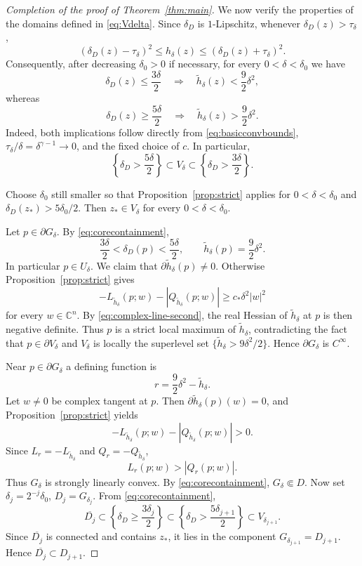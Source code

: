 \documentclass[12pt]{amsart}
\newcommand{\C}{\mathbb C}
\begin{document}
\begin{proof}[Completion of the proof of Theorem~\ref{thm:main}]
We now verify the properties of the domains defined in \eqref{eq:Vdelta}.
Since $\delta_D$ is $1$-Lipschitz, whenever $\delta_D(z)>\tau_\delta$,
\begin{equation}\label{eq:basicconvbounds}
 (\delta_D(z)-\tau_\delta)^2\le h_\delta(z)
 \le(\delta_D(z)+\tau_\delta)^2.
\end{equation}
Consequently, after decreasing $\delta_0>0$ if necessary, for every
$0<\delta<\delta_0$ we have
\[
 \delta_D(z)\le\frac{3\delta}{2}
 \quad\Longrightarrow\quad
 \widetilde h_\delta(z)<\frac92\delta^2,
\]
whereas
\[
 \delta_D(z)\ge\frac{5\delta}{2}
 \quad\Longrightarrow\quad
 \widetilde h_\delta(z)>\frac92\delta^2.
\]
Indeed, both implications follow directly from \eqref{eq:basicconvbounds},
$\tau_\delta/\delta=\delta^{\gamma-1}\to0$, and the fixed choice of $c$.
In particular,
\begin{equation}\label{eq:corecontainment}
 \left\{\delta_D>\frac{5\delta}{2}\right\}
 \subset V_\delta
 \subset
 \left\{\delta_D>\frac{3\delta}{2}\right\}.
\end{equation}

Choose $\delta_0$ still smaller so that Proposition~\ref{prop:strict}
applies for $0<\delta<\delta_0$ and
$\delta_D(z_*)>5\delta_0/2$. Then $z_*\in V_\delta$ for every
$0<\delta<\delta_0$.

Let $p\in\partial G_\delta$. By \eqref{eq:corecontainment},
\[
 \frac{3\delta}{2}<\delta_D(p)<\frac{5\delta}{2},
 \qquad
 \widetilde h_\delta(p)=\frac92\delta^2.
\]
In particular $p\in U_\delta$. We claim that
$\partial\widetilde h_\delta(p)\ne0$. Otherwise
Proposition~\ref{prop:strict} gives
\[
 -L_{\widetilde h_\delta}(p;w)-|Q_{\widetilde h_\delta}(p;w)|
 \ge c_*\delta^2|w|^2
\]
for every $w\in\C^n$. By \eqref{eq:complex-line-second}, the real Hessian
of $\widetilde h_\delta$ at $p$ is then negative definite. Thus $p$ is a
strict local maximum of $\widetilde h_\delta$, contradicting the fact that
$p\in\partial V_\delta$ and $V_\delta$ is locally the superlevel set
$\{\widetilde h_\delta>9\delta^2/2\}$. Hence $\partial G_\delta$ is
$C^\infty$.

Near $p\in\partial G_\delta$ a defining function is
\[
 r=\frac92\delta^2-\widetilde h_\delta.
\]
Let $w\ne0$ be complex tangent at $p$. Then
$\partial\widetilde h_\delta(p)(w)=0$, and
Proposition~\ref{prop:strict} yields
\[
 -L_{\widetilde h_\delta}(p;w)-|Q_{\widetilde h_\delta}(p;w)|>0.
\]
Since $L_r=-L_{\widetilde h_\delta}$ and
$Q_r=-Q_{\widetilde h_\delta}$,
\[
 L_r(p;w)>|Q_r(p;w)|.
\]
Thus $G_\delta$ is strongly linearly convex. By
\eqref{eq:corecontainment}, $G_\delta\Subset D$.
Now set $\delta_j=2^{-j}\delta_0$, $D_j=G_{\delta_j}$.
From \eqref{eq:corecontainment},
\[
 \overline{D_j}\subset
 \left\{\delta_D\ge\frac{3\delta_j}{2}\right\}
 \subset
 \left\{\delta_D>\frac{5\delta_{j+1}}2\right\}
 \subset V_{\delta_{j+1}}.
\]
Since $\overline{D_j}$ is connected and contains $z_*$, it lies in the
component $G_{\delta_{j+1}}=D_{j+1}$. Hence
$\overline{D_j}\subset D_{j+1}$.


\end{proof}
\end{document}
